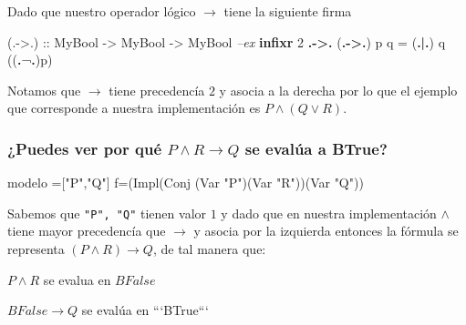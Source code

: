\documentclass[
]{article}
\newenvironment{Shaded}{\begin{snugshade}}{\end{snugshade}}
\newcommand{\CommentTok}[1]{\textcolor[rgb]{0.56,0.35,0.01}{\textit{#1}}}
\newcommand{\DataTypeTok}[1]{\textcolor[rgb]{0.13,0.29,0.53}{#1}}
\newcommand{\DecValTok}[1]{\textcolor[rgb]{0.00,0.00,0.81}{#1}}
\newcommand{\KeywordTok}[1]{\textcolor[rgb]{0.13,0.29,0.53}{\textbf{#1}}}
\newcommand{\NormalTok}[1]{#1}
\newcommand{\OperatorTok}[1]{\textcolor[rgb]{0.81,0.36,0.00}{\textbf{#1}}}
\newcommand{\OtherTok}[1]{\textcolor[rgb]{0.56,0.35,0.01}{#1}}
\newcommand{\StringTok}[1]{\textcolor[rgb]{0.31,0.60,0.02}{#1}}
\begin{document}
Dado que nuestro operador lógico \(\rightarrow\) tiene la siguiente
firma

\begin{Shaded}
\begin{Highlighting}[]
\OtherTok{(.->.) ::} \DataTypeTok{MyBool} \OtherTok{->} \DataTypeTok{MyBool} \OtherTok{->} \DataTypeTok{MyBool} \CommentTok{--ex                                       }
\KeywordTok{infixr} \DecValTok{2} \OperatorTok{.->.}                                                                   
\NormalTok{(}\OperatorTok{.->.}\NormalTok{) p q }\OtherTok{=}\NormalTok{ (}\OperatorTok{.|.}\NormalTok{) q ((}\OperatorTok{.}\NormalTok{¬}\OperatorTok{.}\NormalTok{)p) }
\end{Highlighting}
\end{Shaded}

Notamos que \(\rightarrow\) tiene precedencía \(2\) y asocia a la
derecha por lo que el ejemplo que corresponde a nuestra implementación
es \(P\wedge(Q\lor R)\).

\hypertarget{puedes-ver-por-quuxe9-pwedge-rrightarrow-q-se-evaluxfaa-a-btrue}{%
\subsubsection{\texorpdfstring{¿Puedes ver por qué
\(P\wedge R\rightarrow Q\) se evalúa a
BTrue?}{¿Puedes ver por qué P\textbackslash wedge R\textbackslash rightarrow Q se evalúa a BTrue?}}\label{puedes-ver-por-quuxe9-pwedge-rrightarrow-q-se-evaluxfaa-a-btrue}}

\begin{Shaded}
\begin{Highlighting}[]
\NormalTok{modelo }\OtherTok{=}\NormalTok{[}\StringTok{"P"}\NormalTok{,}\StringTok{"Q"}\NormalTok{]}
\NormalTok{f}\OtherTok{=}\NormalTok{(}\DataTypeTok{Impl}\NormalTok{(}\DataTypeTok{Conj}\NormalTok{ (}\DataTypeTok{Var} \StringTok{"P"}\NormalTok{)(}\DataTypeTok{Var} \StringTok{"R"}\NormalTok{))(}\DataTypeTok{Var} \StringTok{"Q"}\NormalTok{))}
\end{Highlighting}
\end{Shaded}

Sabemos que \texttt{"P",\ "Q"} tienen valor \(1\) y dado que en nuestra
implementación \(\wedge\) tiene mayor precedencía que \(\rightarrow\) y
asocia por la izquierda entonces la fórmula se representa
\((P\wedge R)\rightarrow Q\), de tal manera que:

\begin{center}

$P\wedge R$ se evalua en $BFalse$

$BFalse\rightarrow Q$ se evalúa en ```BTrue```

\end{center}
\end{document}
